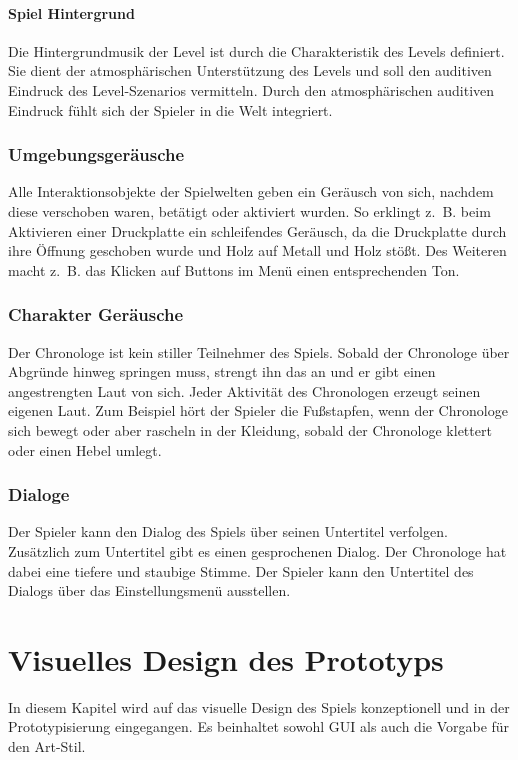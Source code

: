 \subsubsection{Spiel Hintergrund}
Die Hintergrundmusik der Level ist durch die Charakteristik des Levels definiert. Sie dient der atmosphärischen Unterstützung des Levels und soll den auditiven Eindruck des Level-Szenarios vermitteln. Durch den atmosphärischen auditiven Eindruck fühlt sich der Spieler in die Welt integriert.

\subsection{Umgebungsgeräusche}
Alle Interaktionsobjekte der Spielwelten geben ein Geräusch von sich, nachdem diese verschoben waren, betätigt oder aktiviert wurden. So erklingt z. B. beim Aktivieren einer Druckplatte ein schleifendes Geräusch, da die Druckplatte durch ihre Öffnung geschoben wurde und Holz auf Metall und Holz stößt. Des Weiteren macht z. B. das Klicken auf Buttons im Menü einen entsprechenden Ton.

\subsection{Charakter Geräusche}
Der Chronologe ist kein stiller Teilnehmer des Spiels. Sobald der Chronologe über Abgründe hinweg springen muss, strengt ihn das an und er gibt einen angestrengten Laut von sich. Jeder Aktivität des Chronologen erzeugt seinen eigenen Laut. Zum Beispiel hört der Spieler die Fußstapfen, wenn der Chronologe sich bewegt oder aber rascheln in der Kleidung, sobald der Chronologe klettert oder einen Hebel umlegt.

\subsection{Dialoge}
Der Spieler kann den Dialog des Spiels über seinen Untertitel verfolgen. Zusätzlich zum Untertitel gibt es einen gesprochenen Dialog. Der Chronologe hat dabei eine tiefere und staubige Stimme. Der Spieler kann den Untertitel des Dialogs über das Einstellungsmenü ausstellen. 

\chapter{Visuelles Design des Prototyps}\label{sec:design}
In diesem Kapitel wird auf das visuelle Design des Spiels konzeptionell und in der Prototypisierung eingegangen. Es beinhaltet sowohl \ac{GUI} als auch die Vorgabe für den Art-Stil.

